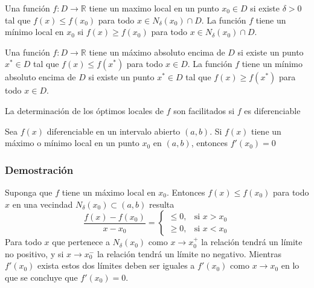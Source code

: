 \begin{definition}
	Una función $f: D \rightarrow \mathbb{R}$ tiene un maximo local en un punto ${x}_{0} \in D$ si existe $\delta > 0$ tal que $f(x) \leq f({x}_{0})$ para todo $x \in {N}_{\delta}({x}_{0}) \cap D$. La función $f$ tiene un mínimo local en ${x}_{0}$ si $f(x) \geq f({x}_{0})$ para todo $x \in {N}_{\delta}({x}_{0}) \cap D$.
\end{definition}

\begin{definition}
	Una función $f: D \rightarrow \mathbb{R}$ tiene un máximo absoluto encima de $D$ si existe un punto $x^* \in D$ tal que $f(x) \leq f(x^*)$ para todo $x \in D$. La función $f$ tiene un mínimo absoluto encima de $D$ si existe un punto $x^* \in D$ tal que $f(x) \geq f(x^*)$ para todo $x \in D$.
\end{definition}

La determinación de los óptimos locales de $f$ son facilitados si $f$ es diferenciable

\begin{theorem}
	\label{teorema_min_max}
	Sea $f(x)$ diferenciable en un intervalo abierto $(a,b)$. Si $f(x)$ tiene un máximo o mínimo local en un punto ${x}_{0}$ en $(a,b)$, entonces $f'({x}_{0})=0$
\end{theorem}
\subsubsection{Demostración}
Suponga que $f$ tiene un máximo local en ${x}_{0}$. Entonces $f(x) \leq f({x}_{0})$ para todo $x$ en una vecindad ${N}_{\delta}({x}_{0}) \subset (a,b)$ resulta
\begin{equation}
	\frac{f(x)-f({x}_{0})}{x-{x}_{0}} =
	\left\{
	\begin{array}{ll}
		\leq 0, & \text{si } x > {x}_{0} \\
		\geq 0, & \text{si } x < {x}_{0}
	\end{array}
	\right.
\end{equation}
Para todo $x$ que pertenece a ${N}_{\delta}({x}_{0})$ como $x \rightarrow {x}_{0}^{+}$ la relación tendrá un límite no positivo, y si $x \rightarrow {x}_{0}^{-}$ la relación tendrá un límite no negativo. Mientras $f'(x_0)$ exista estos dos límites deben ser iguales a $f'({x}_{0})$ como $x \rightarrow {x}_{0}$ en lo que se concluye que $f'({x}_{0})=0$.

